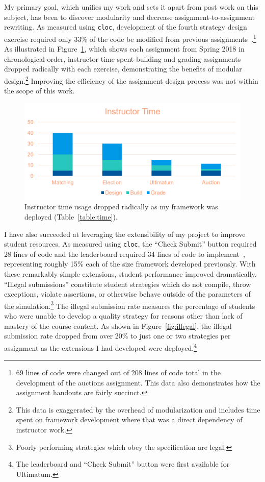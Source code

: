 \documentclass[pageno]{jpaper}
\begin{document}
My primary goal, which unifies my work and sets it apart from past work on this subject, has been to discover modularity and decrease assignment-to-assignment rewriting.
As measured using \texttt{cloc}, development of the fourth strategy design exercise required only 33\% of the code be modified from previous assignments~\cite{s18}.\footnote{69 lines of code were changed out of 208 lines of code total in the development of the auctions assignment. This data also demonstrates how the assignment handouts are fairly succinct.}
As illustrated in Figure~\ref{fig:instructortime}, which shows each assignment from Spring 2018 in chronological order, instructor time spent building and grading assignments dropped radically with each exercise, demonstrating the benefits of modular design.\footnote{This data is exaggerated by the overhead of modularization and includes time spent on framework development where that was a direct dependency of instructor work.}
Improving the efficiency of the assignment design process was not within the scope of this work.
\begin{figure}[hbt]
  \centering
  \includegraphics[width=0.75\linewidth]{instructortime.png}
  \caption{Instructor time usage dropped radically as my framework was deployed (Table~\ref{table:time}).}\label{fig:instructortime}
\end{figure}

I have also succeeded at leveraging the extensibility of my project to improve student resources.
As measured using \texttt{cloc}, the ``Check Submit'' button required 28 lines of code and the leaderboard required 34 lines of code to implement~\cite{s18}, representing roughly 15\% each of the size framework developed previously.
With these remarkably simple extensions, student performance improved dramatically.
``Illegal submissions'' constitute student strategies which do not compile, throw exceptions, violate assertions, or otherwise behave outside of the parameters of the simulation.\footnote{Poorly performing strategies which obey the specification are legal.}
The illegal submission rate measures the percentage of students who were unable to develop a quality strategy for reasons other than lack of mastery of the course content.
As shown in Figure~\ref{fig:illegal}, the illegal submission rate dropped from over 20\% to just one or two strategies per assignment as the extensions I had developed were deployed.\footnote{The leaderboard and ``Check Submit'' button were first available for Ultimatum.}
\end{document}
